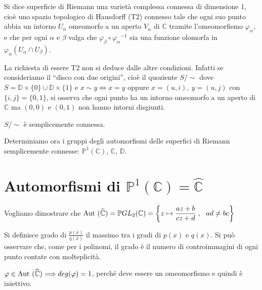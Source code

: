 
\begin{definizione}
Si dice superficie di Riemann una varietà complessa connessa di dimensione $1$, cioè uno spazio topologico di Hausdorff (T2)
connesso tale che ogni suo punto abbia un intorno $U_\alpha$ omeomorfo a un aperto $V_\alpha$ di $\mathbb{C}$
tramite l'omeomorfismo $\varphi_\alpha$, e che per ogni $\alpha$ e $\beta$ valga che $\varphi_\beta \circ {\varphi_\alpha}^{-1}$
sia una funzione olomorfa in $\varphi_\alpha \left( U_\alpha \cap U_\beta \right)$.
\end{definizione}

\begin{osservazione}
La richiesta di essere T2 non si deduce dalle altre condizioni. Infatti se consideriamo il ``disco con due origini'',
	cioè il quoziente $S/\!\!\sim$ dove $S=\mathbb{D} \times \{0\} \cup \mathbb{D} \times \{1\}$ e $x\sim y \Longleftrightarrow x=y$ oppure $x=(u,i),\ y=(u,j)$ con $\{i,j\}=\{0,1\}$,
si osserva che ogni punto ha un intorno omeomorfo a un aperto di $\mathbb{C}$ ma $(0,0)$ e $(0,1)$ non hanno intorni disgiunti.
\end{osservazione}

\begin{esercizio}
$S/\!\!\sim$ è semplicemente connessa.
\end{esercizio}

Determiniamo ora i gruppi degli automorfismi delle superfici di Riemann semplicemente
connesse: $\mathbb{P}^1(\mathbb{C})$, $\mathbb{C}$, $\mathbb{D}$.


\section{Automorfismi di $\mathbb{P}^1(\mathbb{C})=\hat{\mathbb{C}}$}
Vogliamo dimostrare che $\text{Aut }( \widehat{\mathbb{C}} )= \mathbb{P}GL_2 (\mathbb{C} )=\left\{z\mapsto \displaystyle{\frac{az+b}{cz+d}} \ ,\ \  ad\neq bc\right\}$

\begin{definizione}
Si definisce grado di $\frac{p(x)}{q(x)}$ il massimo tra i gradi di $p(x)$ e $q(x)$.
Si può osservare che, come per i polinomi, il grado è il numero di controimmagini di ogni punto contate con molteplicità.
\end{definizione}

\begin{osservazione}
$\varphi \in \text{Aut }( \widehat{\mathbb{C}} ) \Longrightarrow deg(\varphi )=1$, perché deve essere un omeomorfismo e quindi è iniettivo. 
\end{osservazione}


